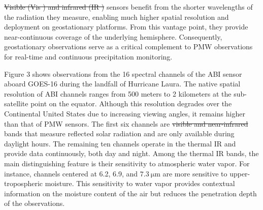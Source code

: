 \documentclass[11pt]{article}
\providecommand{\DIFadd}[1]{{\protect\color{blue}\uwave{#1}}} %
\providecommand{\DIFdel}[1]{{\protect\color{red}\sout{#1}}}                      %
\providecommand{\DIFaddbegin}{} %
\providecommand{\DIFaddend}{} %
\providecommand{\DIFdelbegin}{} %
\providecommand{\DIFdelend}{} %
\begin{document}
\DIFdelbegin \DIFdel{Visible (Vis ) and infrared (IR ) }\DIFdelend \DIFaddbegin \DIFadd{Vis and IR }\DIFaddend sensors benefit from the shorter wavelengths of
the radiation they measure, enabling much higher spatial resolution and
deployment on geostationary platforms. From this vantage point, they provide
near-continuous coverage of the underlying hemisphere. Consequently,
geostationary observations serve as a critical complement to PMW observations
for real-time and continuous precipitation monitoring.

Figure 3 shows observations from the 16 spectral channels of the ABI sensor
aboard GOES-16 during the landfall of Hurricane Laura. The native spatial
resolution of ABI channels ranges from 500 meters to 2 kilometers at the
sub-satellite point on the equator. Although this resolution degrades over the
Continental United States due to increasing viewing angles, it remains higher
than that of PMW sensors. The first six channels are \DIFdelbegin \DIFdel{visible and near-infrared
}\DIFdelend \DIFaddbegin \DIFadd{VIs and near-IR
}\DIFaddend bands that measure reflected solar radiation and are only available during
daylight hours. The remaining ten channels operate in the thermal IR and provide
data continuously, both day and night. Among the thermal IR bands, the main
distinguishing feature is their sensitivity to atmospheric water vapor. For
instance, channels centered at 6.2, 6.9, and $\SI{7.3}{\micro \meter}$ are more
sensitive to upper-tropospheric moisture. This sensitivity to water vapor
provides contextual information on the moisture content of the air but reduces
the penetration depth of the observations.
\end{document}
